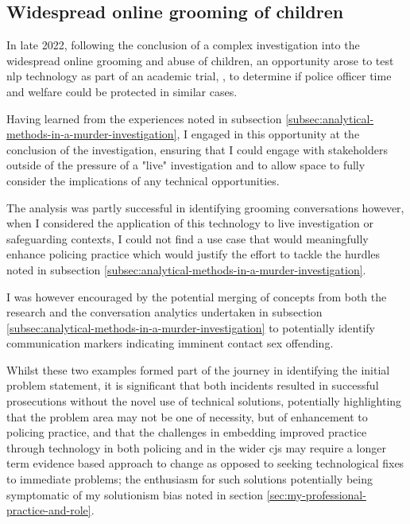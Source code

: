 \documentclass[12pt,a4paper,oneside]{report}
\begin{document}
\subsection{Widespread online grooming of children}
\label{subsec:widespread-online-grooming-of-children}
In late 2022, following the conclusion of a complex investigation into the widespread online grooming and abuse of children, an opportunity arose to test \gls{nlp} technology as part of an academic trial, \citep{swansea2023dragon}, to determine if police officer time and welfare could be protected in similar cases.

Having learned from the experiences noted in subsection \ref{subsec:analytical-methods-in-a-murder-investigation}, I engaged in this opportunity at the conclusion of the investigation, ensuring that I could engage with stakeholders outside of the pressure of a "live" investigation and to allow space to fully consider the implications of any technical opportunities.

The analysis was partly successful in identifying grooming conversations however, when I considered the application of this technology to live investigation or safeguarding contexts, I could not find a use case that would meaningfully enhance policing practice which would justify the effort to tackle the hurdles noted in subsection \ref{subsec:analytical-methods-in-a-murder-investigation}.

I was however encouraged by the potential merging of concepts from both the \citet{swansea2023dragon} research and the conversation analytics undertaken in subsection \ref{subsec:analytical-methods-in-a-murder-investigation} to potentially identify communication markers indicating imminent contact sex offending.

Whilst these two examples formed part of the journey in identifying the initial problem statement, it is significant that both incidents resulted in successful prosecutions without the novel use of technical solutions, potentially highlighting that the problem area may not be one of necessity, but of enhancement to policing practice, and that the challenges in embedding improved practice through technology in both policing and in the wider \gls{cjs} may require a longer term evidence based approach to change as opposed to seeking technological fixes to immediate problems; the enthusiasm for such solutions potentially being symptomatic of my solutionism bias noted in section \ref{sec:my-professional-practice-and-role}.

\end{document}
